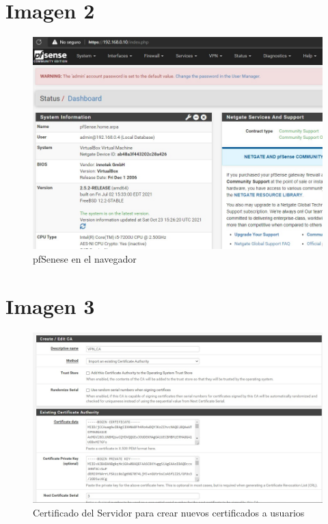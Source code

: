 \documentclass[12pt,letterspaper]{report}
\begin{document}
\chapter*{Imagen 2}
\vspace {0.3cm}
\begin{figure}[htb]
\centering
\includegraphics[scale=0.5]{Img2.jpg}
\caption{pfSenese en el navegador}
\end{figure}\par
\vspace {0.1cm}


\chapter*{Imagen 3}
\vspace {0.3cm}
\begin{figure}[htb]
\centering
\includegraphics[scale=0.5]{Img3.jpg}
\caption{{Certificado del Servidor para crear nuevos certificados a usuarios}}
\end{figure}\par
\vspace {0.1cm}
\end{document}
